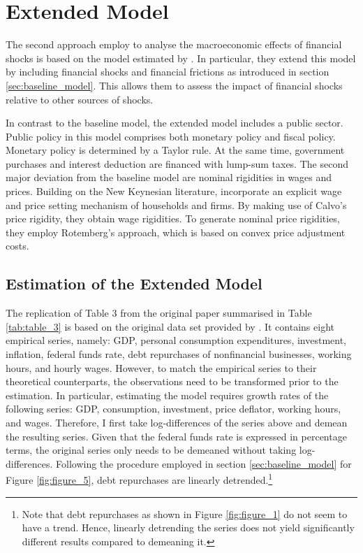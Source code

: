 \section{Extended Model}
\label{sec:extended_model}

The second approach \citeauthor{JERMANNfinancial} employ to analyse the macroeconomic effects of financial shocks is based on the model estimated by \citet{SMETSshocks}. In particular, they extend this model by including financial shocks and financial frictions as introduced in section \ref{sec:baseline_model}. This allows them to assess the impact of financial shocks relative to other sources of shocks. 

In contrast to the baseline model, the extended model includes a public sector. Public policy in this model comprises both monetary policy and fiscal policy. Monetary policy is determined by a Taylor rule. At the same time, government purchases and interest deduction are financed with lump-sum taxes. The second major deviation from the baseline model are nominal rigidities in wages and prices. Building on the New Keynesian literature, \citeauthor{JERMANNfinancial} incorporate an explicit wage and price setting mechanism of households and firms. By making use of Calvo's price rigidity, they obtain wage rigidities. To generate nominal price rigidities, they employ Rotemberg's approach, which is based on convex price adjustment costs.


\subsection{Estimation of the Extended Model}
\label{sec:extended_model_estimation}



The replication of Table 3 from the original paper summarised in Table \ref{tab:table_3} is based on the original data set provided by \citeauthor{JERMANNfinancial}. It contains eight empirical series, namely: GDP, personal consumption expenditures, investment, inflation, federal funds rate, debt repurchases of nonfinancial businesses, working hours, and hourly wages. However, to match the empirical series to their theoretical counterparts, the observations need to be transformed prior to the estimation. In particular, estimating the model requires growth rates of the following series: GDP, consumption, investment, price deflator, working hours, and wages. Therefore, I first take log-differences of the series above and demean the resulting series. Given that the federal funds rate is expressed in percentage terms, the original series only needs to be demeaned without taking log-differences. Following the procedure employed in section \ref{sec:baseline_model} for Figure \ref{fig:figure_5}, debt repurchases are linearly detrended.\footnote{Note that debt repurchases as shown in Figure \ref{fig:figure_1} do not seem to have a trend. Hence, linearly detrending the series does not yield significantly different results compared to demeaning it.}

